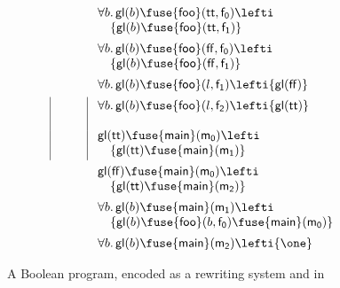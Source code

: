 \begin{figure}
\[\begin{array}{|rcl|}
  & &\\[15pt]
  & &\\
  & &\\
\end{array}
~
\begin{array}{l}
\forall b.\,{\sf gl}(b) \fuse {\sf foo}({\sf tt}, {\sf f_0}) \lefti ~\\
\quad \{ {\sf gl}(b) \fuse {\sf foo}({\sf tt}, {\sf f_1}) \}\\[5pt]
\forall b.\,{\sf gl}(b) \fuse {\sf foo}({\sf ff}, {\sf f_0}) \lefti ~\\
\quad \{ {\sf gl}(b) \fuse {\sf foo}({\sf ff}, {\sf f_1}) \}\\[5pt]
\forall b.\,{\sf gl}(b) \fuse {\sf foo}(l, {\sf f_1}) \lefti \{ {\sf gl}({\sf ff}) \}\\[5pt]
\forall b.\,{\sf gl}(b) \fuse {\sf foo}(l, {\sf f_2}) \lefti \{ {\sf gl}({\sf tt}) \}\\
\\
{\sf gl}({\sf tt}) \fuse {\sf main}({\sf m_0}) \lefti ~\\
\quad \{ {\sf gl}({\sf tt}) \fuse {\sf main}({\sf m_1}) \}\\[5pt]
{\sf gl}({\sf ff}) \fuse {\sf main}({\sf m_0}) \lefti ~\\
\quad \{ {\sf gl}({\sf tt}) \fuse {\sf main}({\sf m_2})\}\\[5pt]
\forall b.\,{\sf gl}(b) \fuse {\sf main}({\sf m_1}) \lefti ~\\
\quad \{ {\sf gl}(b) \fuse {\sf foo}(b,{\sf f_0}) \fuse {\sf main}({\sf m_0})\}\\[5pt]
\forall b.\,{\sf gl}(b) \fuse {\sf main}({\sf m_2}) \lefti \{ \one \}
\end{array}
\]
\caption{A Boolean program, encoded as a rewriting system and in \sls}
\label{fig:canonical}
\end{figure}
